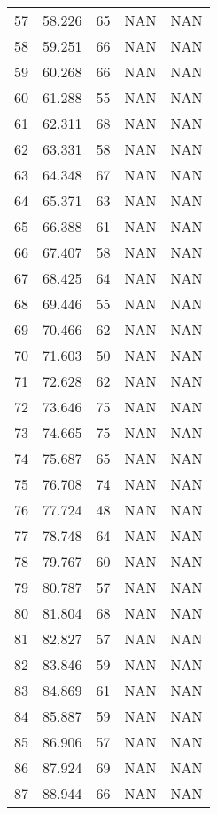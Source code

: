 \documentclass{article}
\begin{document}
\begin{longtable}{@{}lllll@{}}
				57  & 58.226  & 65    & NAN   & NAN   \\
				58  & 59.251  & 66    & NAN   & NAN   \\
				59  & 60.268  & 66    & NAN   & NAN   \\
				60  & 61.288  & 55    & NAN   & NAN   \\
				61  & 62.311  & 68    & NAN   & NAN   \\
				62  & 63.331  & 58    & NAN   & NAN   \\
				63  & 64.348  & 67    & NAN   & NAN   \\
				64  & 65.371  & 63    & NAN   & NAN   \\
				65  & 66.388  & 61    & NAN   & NAN   \\
				66  & 67.407  & 58    & NAN   & NAN   \\
				67  & 68.425  & 64    & NAN   & NAN   \\
				68  & 69.446  & 55    & NAN   & NAN   \\
				69  & 70.466  & 62    & NAN   & NAN   \\
				70  & 71.603  & 50    & NAN   & NAN   \\
				71  & 72.628  & 62    & NAN   & NAN   \\
				72  & 73.646  & 75    & NAN   & NAN   \\
				73  & 74.665  & 75    & NAN   & NAN   \\
				74  & 75.687  & 65    & NAN   & NAN   \\
				75  & 76.708  & 74    & NAN   & NAN   \\
				76  & 77.724  & 48    & NAN   & NAN   \\
				77  & 78.748  & 64    & NAN   & NAN   \\
				78  & 79.767  & 60    & NAN   & NAN   \\
				79  & 80.787  & 57    & NAN   & NAN   \\
				80  & 81.804  & 68    & NAN   & NAN   \\
				81  & 82.827  & 57    & NAN   & NAN   \\
				82  & 83.846  & 59    & NAN   & NAN   \\
				83  & 84.869  & 61    & NAN   & NAN   \\
				84  & 85.887  & 59    & NAN   & NAN   \\
				85  & 86.906  & 57    & NAN   & NAN   \\
				86  & 87.924  & 69    & NAN   & NAN   \\
				87  & 88.944  & 66    & NAN   & NAN   \\

\end{longtable}
\end{document}

